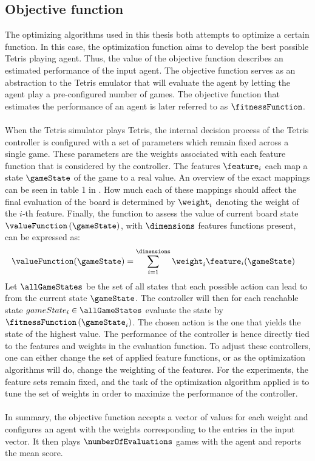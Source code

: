 \subsection{Objective function}

The optimizing algorithms used in this thesis both attempts to 
optimize a certain function. In this case, the optimization 
function aims to develop the best possible Tetris playing agent.
Thus, the value of the objective function describes an estimated 
performance of the input agent. The objective function serves as
an abstraction to the Tetris emulator that will evaluate 
the agent by letting the agent play a pre-configured number 
of games. The objective function that estimates the performance 
of an agent is later referred to as $\fitnessFunction$.\\
\\
When the Tetris simulator plays Tetris, the internal decision process
of the Tetris controller is configured with a set of parameters which remain
fixed across a single game. These parameters are the weights associated 
with each feature function that is considered by the controller. 
The features $\feature _{i}$
each map a state $\gameState$ of the game to a real value. 
An overview of the exact mappings
can be seen in table 1 in \citep{scherrer2009:b}. How much each of these mappings
should affect the final evaluation of the board is determined by $\weight _{i}$
denoting the weight of the $i$-th feature.
Finally, the function to assess the value 
of current board state $\valueFunction \left( \gameState \right)$, 
with $\dimensions$ features functions present, can be expressed as:
\begin{align*}
\valueFunction (\gameState ) &= 
\sum_{i=1}^{\dimensions} \weight _{i}\feature _{i}(\gameState )
\end{align*}
Let $\allGameStates$ be the set of all states that each possible 
action can lead to from the current state $\gameState$. The 
controller will then for each reachable state 
$gameState_i \in \allGameStates$ evaluate the state by 
$\fitnessFunction \left( \gameState_i \right)$. 
The chosen action is the one that yields the state of the highest value.
The performance of the controller is hence directly tied to the 
features and weights in the evaluation function. To adjust these controllers,
one can either change the set of applied feature functions, or as the 
optimization algorithms will do, change the weighting of the features.
For the experiments, the feature sets remain fixed, and the task of the
optimization algorithm applied is to tune the set of weights in order 
to maximize the performance of the controller.\\
\\
In summary, the objective function accepts a vector of values for each weight
and configures an agent with the weights corresponding to the entries in
the input vector. It then plays $\numberOfEvaluations$ games with the
agent and reports the mean score.

